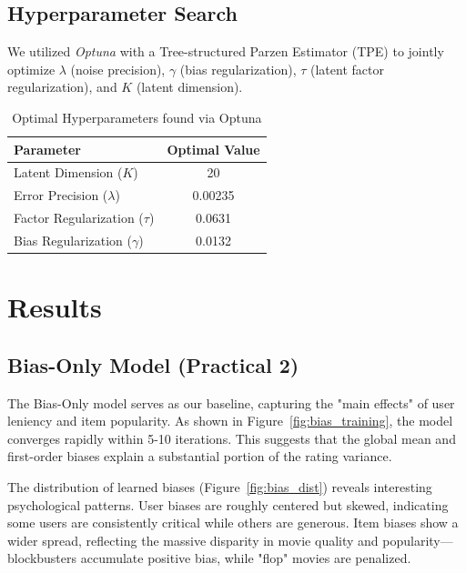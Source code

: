 \documentclass{article}
\theoremstyle{plain}
\theoremstyle{definition}
\theoremstyle{remark}
\begin{document}
\subsection{Hyperparameter Search}
We utilized \textit{Optuna} with a Tree-structured Parzen Estimator (TPE) to jointly optimize $\lambda$ (noise precision), $\gamma$ (bias regularization), $\tau$ (latent factor regularization), and $K$ (latent dimension).

\begin{table}[h]
\caption{Optimal Hyperparameters found via Optuna}
\centering
\begin{tabular}{lc}
\toprule
Parameter & Optimal Value \\
\midrule
Latent Dimension ($K$) & 20 \\
Error Precision ($\lambda$) & 0.00235 \\
Factor Regularization ($\tau$) & 0.0631 \\
Bias Regularization ($\gamma$) & 0.0132 \\
\bottomrule
\end{tabular}
\label{tab:hyperparams}
\end{table}

\section{Results} %

\subsection{Bias-Only Model (Practical 2)}
The Bias-Only model serves as our baseline, capturing the "main effects" of user leniency and item popularity. As shown in Figure~\ref{fig:bias_training}, the model converges rapidly within 5-10 iterations. This suggests that the global mean and first-order biases explain a substantial portion of the rating variance.

The distribution of learned biases (Figure~\ref{fig:bias_dist}) reveals interesting psychological patterns. User biases are roughly centered but skewed, indicating some users are consistently critical while others are generous. Item biases show a wider spread, reflecting the massive disparity in movie quality and popularity—blockbusters accumulate positive bias, while "flop" movies are penalized.
\end{document}

